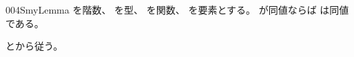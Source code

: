 \documentclass[index]{subfiles}
\begin{document}
\begin{myBlock}{004S}{myLemma}
  を階数、
  を型、
  を関数、
  を要素とする。
  が同値ならば
  は同値である。
\end{myBlock}
\begin{myProof}
  とから従う。
\end{myProof}
\end{document}
